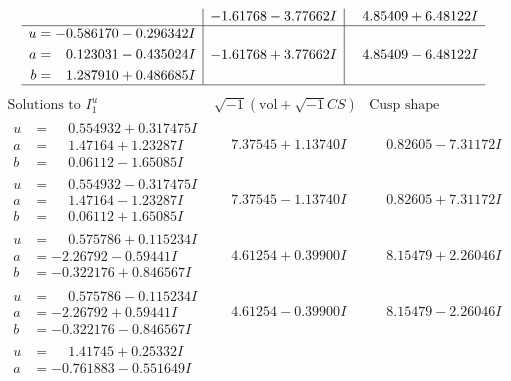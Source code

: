 \documentclass[1p]{elsarticle_modified}
\theoremstyle{definition}
\newcommand{\I}{\sqrt{-1}}
\begin{document}
$$\begin{array}{c|c|c}
 & -1.61768 - 3.77662 I & \phantom{-}4.85409 + 6.48122 I \\ \hline\begin{aligned}
u &= -0.586170 - 0.296342 I \\
a &= \phantom{-}0.123031 - 0.435024 I \\
b &= \phantom{-}1.287910 + 0.486685 I\end{aligned}
 & -1.61768 + 3.77662 I & \phantom{-}4.85409 - 6.48122 I\\
 \hline 
 \end{array}$$\newpage$$\begin{array}{c|c|c}  
\text{Solutions to }I^u_{1}& \I (\text{vol} + \sqrt{-1}CS) & \text{Cusp shape}\\
 \hline 
\begin{aligned}
u &= \phantom{-}0.554932 + 0.317475 I \\
a &= \phantom{-}1.47164 + 1.23287 I \\
b &= \phantom{-}0.06112 - 1.65085 I\end{aligned}
 & \phantom{-}7.37545 + 1.13740 I & \phantom{-}0.82605 - 7.31172 I \\ \hline\begin{aligned}
u &= \phantom{-}0.554932 - 0.317475 I \\
a &= \phantom{-}1.47164 - 1.23287 I \\
b &= \phantom{-}0.06112 + 1.65085 I\end{aligned}
 & \phantom{-}7.37545 - 1.13740 I & \phantom{-}0.82605 + 7.31172 I \\ \hline\begin{aligned}
u &= \phantom{-}0.575786 + 0.115234 I \\
a &= -2.26792 - 0.59441 I \\
b &= -0.322176 + 0.846567 I\end{aligned}
 & \phantom{-}4.61254 + 0.39900 I & \phantom{-}8.15479 + 2.26046 I \\ \hline\begin{aligned}
u &= \phantom{-}0.575786 - 0.115234 I \\
a &= -2.26792 + 0.59441 I \\
b &= -0.322176 - 0.846567 I\end{aligned}
 & \phantom{-}4.61254 - 0.39900 I & \phantom{-}8.15479 - 2.26046 I \\ \hline\begin{aligned}
u &= \phantom{-}1.41745 + 0.25332 I \\
a &= -0.761883 - 0.551649 I \\

\end{aligned}
\end{array}$$
\end{document}
